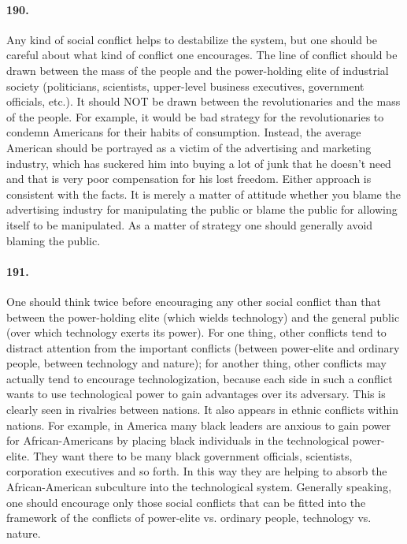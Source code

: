 \documentclass[12pt]{book}
\begin{document}
\paragraph{190.} Any kind of social conflict helps to destabilize the system, but one should be careful about what kind of conflict one encourages. The line of conflict should be drawn between the mass of the people and the power-holding elite of industrial society (politicians, scientists, upper-level business executives, government officials, etc.). It should NOT be drawn between the revolutionaries and the mass of the people. For example, it would be bad strategy for the revolutionaries to condemn Americans for their habits of consumption. Instead, the average American should be portrayed as a victim of the advertising and marketing industry, which has suckered him into buying a lot of junk that he doesn't need and that is very poor compensation for his lost freedom. Either approach is consistent with the facts. It is merely a matter of attitude whether you blame the advertising industry for manipulating the public or blame the public for allowing itself to be manipulated. As a matter of strategy one should generally avoid blaming the public.


\paragraph{191.}  One should think twice before encouraging any other social conflict than that between the power-holding elite (which wields technology) and the general public (over which technology exerts its power). For one thing, other conflicts tend to distract attention from the important conflicts (between power-elite and ordinary people, between technology and nature); for another thing, other conflicts may actually tend to encourage technologization, because each side in such a conflict wants to use technological power to gain advantages over its adversary. This is clearly seen in rivalries between nations. It also appears in ethnic conflicts within nations.  For example, in America many black leaders are anxious to gain power for African-Americans by placing black individuals in the technological power-elite.  They want there to be many black government officials, scientists, corporation executives and so forth. In this way they are helping to absorb the African-American subculture into the technological system. Generally speaking, one should encourage only those social conflicts that can be fitted into the framework of the conflicts of power-elite vs. ordinary people, technology vs. nature.
\end{document}
